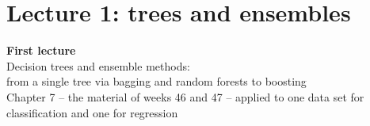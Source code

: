 \documentclass[10pt,aspectratio=169]{beamer}
\begin{document}
\section{Lecture 1: trees and ensembles}

\begin{frame}{}
\centering
{\Large\textbf{First lecture}}\\[6pt]
{\large Decision trees and ensemble methods:\\ from a single tree via
bagging and random forests to boosting}\\[14pt]
\small Chapter 7 -- the material of weeks 46 and 47 -- applied to one data
set for classification and one for regression
\end{frame}
\end{document}
